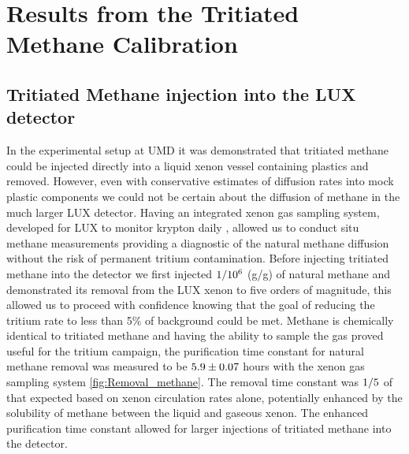 \section{Results from the Tritiated Methane Calibration}

\subsection{Tritiated Methane injection into the LUX detector}

In the experimental setup at UMD it was demonstrated that tritiated methane could be injected directly into a liquid xenon vessel containing plastics and removed. However, even with conservative estimates of diffusion rates into mock plastic components we could not be certain about the diffusion of methane in the much larger LUX detector. Having an integrated xenon gas sampling system, developed for LUX to monitor krypton daily \cite{Kr_ppt_Dobi} \cite{EXO_SAM}, allowed us to conduct situ methane measurements providing a diagnostic of the natural methane diffusion without the risk of permanent tritium contamination. Before injecting tritiated methane into the detector we first injected $\rm 1/10^{6}$ (g/g) of natural methane and demonstrated its removal from the LUX xenon to five orders of magnitude, this allowed us to proceed with confidence knowing that the goal of reducing the tritium rate to less than 5\% of background could be met. Methane is chemically identical to tritiated methane and having the ability to sample the gas proved useful for the tritium campaign, the purification time constant for natural methane removal was measured to be $\rm 5.9 \pm 0.07$ hours with the xenon gas sampling system \ref{fig:Removal_methane}. The removal time constant was $\rm 1/5$ of that expected based on xenon circulation rates alone, potentially enhanced by the solubility of methane between the liquid and gaseous xenon. The enhanced purification time constant allowed for larger injections of tritiated methane into the detector. 



